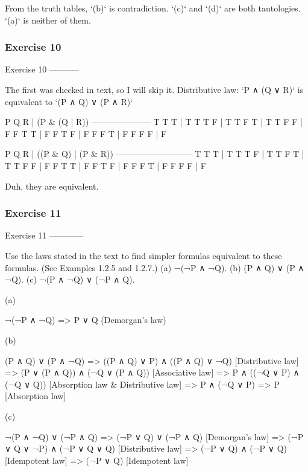 From the truth tables, `(b)` is contradiction. `(c)` and `(d)` are
both tautologies. `(a)` is neither of them.

\subsubsection{Exercise 10}
Exercise 10
-----------

The first was checked in text, so I will skip it.
Distributive law: `P ∧ (Q ∨ R)` is equivalent to `(P ∧ Q) ∨ (P ∧ R)`

    P Q R | (P & (Q | R))
    ---------------------
    T T T | T
    T T F | T
    T F T | T
    T F F | F
    F T T | F
    F T F | F
    F F T | F
    F F F | F

    P Q R | ((P & Q) | (P & R))
    ---------------------------
    T T T | T
    T T F | T
    T F T | T
    T F F | F
    F T T | F
    F T F | F
    F F T | F
    F F F | F

Duh, they are equivalent.

\subsubsection{Exercise 11}
Exercise 11
------------

    Use the laws stated in the text to find simpler formulas equivalent to these
    formulas. (See Examples 1.2.5 and 1.2.7.)
    (a) ¬(¬P ∧ ¬Q).
    (b) (P ∧ Q) ∨ (P ∧ ¬Q).
    (c) ¬(P ∧ ¬Q) ∨ (¬P ∧ Q).

(a)

    ¬(¬P ∧ ¬Q)
    => P ∨ Q    (Demorgan's law)

(b)

    (P ∧ Q) ∨ (P ∧ ¬Q)
    => ((P ∧ Q) ∨ P) ∧ ((P ∧ Q) ∨ ¬Q)  [Distributive law]
    => (P ∨ (P ∧ Q)) ∧ (¬Q ∨ (P ∧ Q))  [Associative law]
    => P ∧ ((¬Q ∨ P) ∧ (¬Q ∨ Q)) [Absorption law & Distributive law]
    => P ∧ (¬Q ∨ P)
    => P [Absorption law]

(c)

    ¬(P ∧ ¬Q) ∨ (¬P ∧ Q)
    => (¬P ∨ Q) ∨ (¬P ∧ Q) [Demorgan's law]
    => (¬P ∨ Q ∨ ¬P) ∧ (¬P ∨ Q ∨ Q) [Distributive law]
    => (¬P ∨ Q) ∧ (¬P ∨ Q) [Idempotent law]
    => (¬P ∨ Q)  [Idempotent law]

